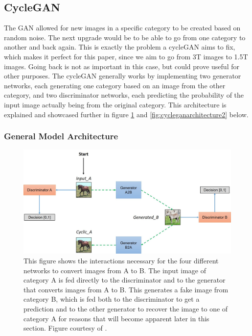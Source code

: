 \documentclass[12pt, fleqn, titlepage]{article}
\newcommand{\1}[1]{\mathds{1}\left[#1\right]}
\begin{document}
\subsection{CycleGAN}\label{cyclegan}
The GAN allowed for new images in a specific category to be created based on random noise. The next upgrade would be to be able to go from one category to another and back again. This is exactly the problem a cycleGAN aims to fix, which makes it perfect for this paper, since we aim to go from 3T images to 1.5T images. Going back is not as important in this case, but could prove useful for other purposes. The cycleGAN generally works by implementing two generator networks, each generating one category based on an image from the other category, and two discriminator networks, each predicting the probability of the input image actually being from the original category. This architecture is explained and showcased further in figure \ref{fig:cycleganarchitecture} and \ref{fig:cycleganarchitecture2} below.

\subsubsection{General Model Architecture}
\begin{figure}[H]
	\centering
	\includegraphics[width=0.7\linewidth]{imgs/cyclegan_architecture}
	\caption{This figure shows the interactions necessary for the four different networks to convert images from A to B. The input image of category A is fed directly to the discriminator and to the generator that converts images from A to B. This generates a fake image from category B, which is fed both to the discriminator to get a prediction and to the other generator to recover the image to one of category A for reasons that will become apparent later in this section. Figure courtesy of \cite{model_architecture}.}
	\label{fig:cycleganarchitecture}
\end{figure}
\end{document}
